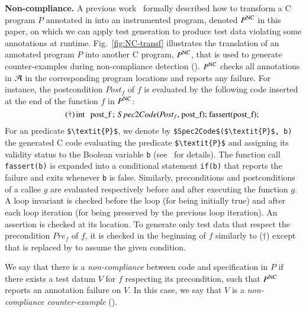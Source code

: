 \textbf{Non-compliance.}
A previous work~\cite{Petiot/SCAM14} formally described 
how to transform a C program $P$ annotated in \eacsl
into an instrumented program, denoted  $P^\mathrm{NC}$ in this paper,
on which we can apply test generation to produce test data %
violating some annotations at runtime.
Fig.~\ref{fig:NC-transf} illustrates the translation of an annotated program $P$
into another C program, $P^{\mathrm{NC}}$, that is used to generate counter-examples 
during non-compliance detection (\NCD).
$P^\mathrm{NC}$ checks all annotations in ${\mathcal{A}}$ in the corresponding program locations
and reports any failure.
For instance, the postcondition $\textit{Post}_f$ of $f$
is evaluated by the following code inserted at the end of the function $f$ in $P^\mathrm{NC}$:
\begin{equation}\tag{$\dagger$}
\mbox{\lstinline[mathescape]'int post_f;  $\ Spec2Code$($\textit{Post}_f$, post_f); fassert(post_f);'}
\end{equation}
For an \eacsl predicate \lstinline[mathescape]'$\textit{P}$',
we denote by \lstinline[mathescape]'$Spec2Code$($\textit{P}$, b)'
the generated C code  evaluating the predicate
\lstinline[mathescape]'$\textit{P}$'
and assigning its validity status to the Boolean 
variable \lstinline[mathescape]'b' (see~\cite{Petiot/SCAM14} for details).
The function call \lstinline[mathescape]'fassert(b)'
is expanded into a conditional
statement \lstinline[mathescape]'if(b)' that reports the failure and exits 
whenever \lstinline[mathescape]'b' is false.
Similarly, preconditions and postconditions of a callee $g$
are evaluated respectively before and after executing the function $g$.
A loop invariant is checked before the loop (for being initially true) 
and after each loop iteration (for being preserved by the previous
loop iteration). 
An assertion is checked at its location.
To generate only test data  that respect
the precondition $\textit{Pre}_f$ of $f$,
it is checked  in the beginning of $f$ 
similarly to ($\dagger$)
except that \fassert
is replaced by \fassume
to assume the given condition.

\begin{definition} 
\label{def:NC}
We say that there is a \emph{non-compliance} between code and specification in $P$
if there exists  a test datum $V$ for $f$ respecting its precondition,
such that $P^{\mathrm{NC}}$ reports an annotation failure on $V$.
In this case, we say that $V$ is a \emph{non-compliance counter-example} (\NCCE).
\end{definition}

